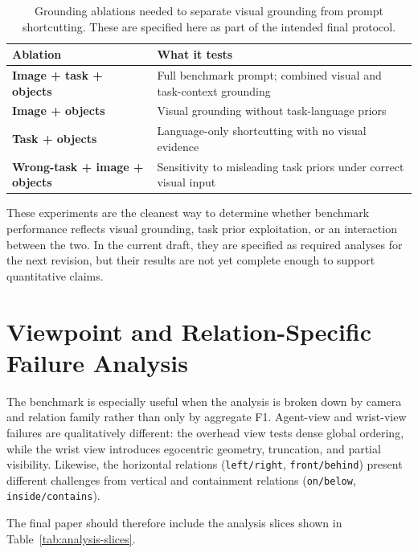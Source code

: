 \documentclass{article}
\begin{document}
\begin{table}[t]
    \caption{Grounding ablations needed to separate visual grounding from prompt shortcutting. These are specified here as part of the intended final protocol.}
    \label{tab:ablations}
    \centering
    \begin{tabularx}{\linewidth}{lX}
        \toprule
        Ablation & What it tests \\
        \midrule
        \textbf{Image + task + objects} & Full benchmark prompt; combined visual and task-context grounding \\
        \textbf{Image + objects} & Visual grounding without task-language priors \\
        \textbf{Task + objects} & Language-only shortcutting with no visual evidence \\
        \textbf{Wrong-task + image + objects} & Sensitivity to misleading task priors under correct visual input \\
        \bottomrule
    \end{tabularx}
\end{table}

These experiments are the cleanest way to determine whether benchmark performance reflects visual grounding, task prior exploitation, or an interaction between the two. In the current draft, they are specified as required analyses for the next revision, but their results are not yet complete enough to support quantitative claims.

\section{Viewpoint and Relation-Specific Failure Analysis}
The benchmark is especially useful when the analysis is broken down by camera and relation family rather than only by aggregate F1. Agent-view and wrist-view failures are qualitatively different: the overhead view tests dense global ordering, while the wrist view introduces egocentric geometry, truncation, and partial visibility. Likewise, the horizontal relations (\texttt{left/right}, \texttt{front/behind}) present different challenges from vertical and containment relations (\texttt{on/below}, \texttt{inside/contains}).

The final paper should therefore include the analysis slices shown in Table~\ref{tab:analysis-slices}.
\end{document}
